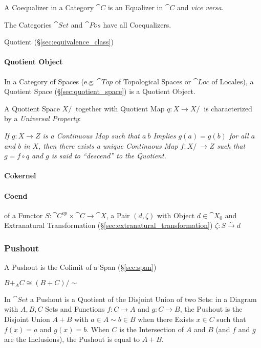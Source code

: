 A Coequalizer in a Category $\cat{C}$ is an Equalizer in
$\cat{C}$ and \emph{vice versa}.

The Categories $\cat{Set}$ and $\cat{Pos}$ have all
Coequalizers.

Quotient (\S\ref{sec:equivalence_class})



\paragraph{Quotient Object}\label{sec:quotient_object}\hfill

In a Category of Spaces (e.g. $\cat{Top}$ of Topological Spaces or $\cat{Loc}$
of Locales), a Quotient Space (\S\ref{sec:quotient_space}) is a Quotient
Object.

A Quotient Space $X/~$ together with Quotient Map $q : X \rightarrow X/~$ is
characterized by a \emph{Universal Property}:

\emph{If $g : X \rightarrow Z$ is a Continuous Map such that $a ~ b$ Implies $g(a)
  = g(b)$ for all $a$ and $b$ in $X$, then there exists a unique Continuous Map
  $f : X/~ \rightarrow Z$ such that $g = f \circ q$ and $g$ is said to
  ``descend'' to the Quotient.}



\paragraph{Cokernel}\label{sec:cokernel}\hfill

\paragraph{Coend}\label{sec:coend}\hfill

of a Functor $S : \cat{C}^{op} \times \cat{C} \rightarrow
\cat{X}$, a Pair $(d, \zeta)$ with Object $d \in \cat{X}_0$ and
Extranatural Transformation (\S\ref{sec:extranatural_transformation})
$\zeta : S \xrightarrow{..} d$



\subsubsection{Pushout}\label{sec:pushout}

A Pushout is the Colimit of a Span (\S\ref{sec:span})

$B +_A C \cong (B + C)/\sim$

In $\cat{Set}$ a Pushout is a Quotient of the Disjoint Union of two
Sets: in a Diagram with $A,B,C$ Sets and Functions $f : C \rightarrow
A$ and $g : C \rightarrow B$, the Pushout is the Disjoint Union $A +
B$ with $a \in A \sim b \in B$ when there Exists $x \in C$ such that
$f(x) = a$ and $g(x) = b$. When $C$ is the Intersection of $A$ and $B$
(and $f$ and $g$ are the Inclusions), the Pushout is equal to $A + B$.

